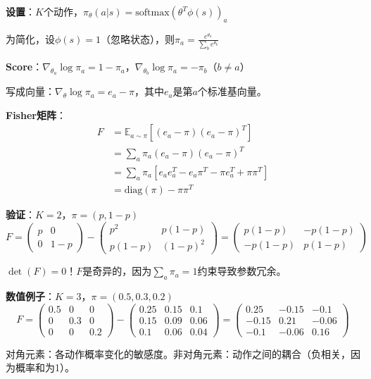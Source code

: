\documentclass[11pt,a4paper]{article}
\theoremstyle{definition}
\begin{document}
\begin{calculation}[Softmax策略的Fisher矩阵]
\textbf{设置}：$K$个动作，$\pi_\theta(a|s) = \text{softmax}(\theta^T \phi(s))_a$

为简化，设$\phi(s) = 1$（忽略状态），则$\pi_a = \frac{e^{\theta_a}}{\sum_b e^{\theta_b}}$

\textbf{Score}：$\nabla_{\theta_a} \log \pi_a = 1 - \pi_a$，$\nabla_{\theta_b} \log \pi_a = -\pi_b$（$b \neq a$）

写成向量：$\nabla_\theta \log \pi_a = e_a - \pi$，其中$e_a$是第$a$个标准基向量。

\textbf{Fisher矩阵}：
\begin{align*}
F &= \mathbb{E}_{a \sim \pi}[(e_a - \pi)(e_a - \pi)^T] \\
&= \sum_a \pi_a (e_a - \pi)(e_a - \pi)^T \\
&= \sum_a \pi_a [e_a e_a^T - e_a \pi^T - \pi e_a^T + \pi\pi^T] \\
&= \text{diag}(\pi) - \pi\pi^T
\end{align*}

\textbf{验证}：$K = 2$，$\pi = (p, 1-p)$
\[
F = \begin{pmatrix} p & 0 \\ 0 & 1-p \end{pmatrix} - \begin{pmatrix} p^2 & p(1-p) \\ p(1-p) & (1-p)^2 \end{pmatrix} = \begin{pmatrix} p(1-p) & -p(1-p) \\ -p(1-p) & p(1-p) \end{pmatrix}
\]

$\det(F) = 0$！$F$是奇异的，因为$\sum_a \pi_a = 1$约束导致参数冗余。

\textbf{数值例子}：$K=3$，$\pi = (0.5, 0.3, 0.2)$
\[
F = \begin{pmatrix} 0.5 & 0 & 0 \\ 0 & 0.3 & 0 \\ 0 & 0 & 0.2 \end{pmatrix} - \begin{pmatrix} 0.25 & 0.15 & 0.1 \\ 0.15 & 0.09 & 0.06 \\ 0.1 & 0.06 & 0.04 \end{pmatrix} = \begin{pmatrix} 0.25 & -0.15 & -0.1 \\ -0.15 & 0.21 & -0.06 \\ -0.1 & -0.06 & 0.16 \end{pmatrix}
\]

对角元素：各动作概率变化的敏感度。非对角元素：动作之间的耦合（负相关，因为概率和为1）。
\end{calculation}
\end{document}
